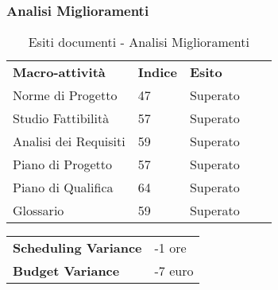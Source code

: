 \subsubsection{Analisi Miglioramenti}
\begin{table}[!ht]
			\centering
				\begin{tabular}{|l|l|l|ll}
					\cline{1-3}
					 \textbf{Macro-attività}  & \textbf{Indice \glossaryItem{Gulpease}}  & \textbf{Esito}  &  \\ \cline{1-3}
					 Norme di Progetto  & 47 & Superato &  \\ \cline{1-3}
					 Studio Fattibilità & 57 & Superato &  \\ \cline{1-3}
					 Analisi dei Requisiti & 59 & Superato &  \\ \cline{1-3}
					 Piano di Progetto & 57 & Superato &  \\ \cline{1-3}
					 Piano di Qualifica & 64 & Superato &  \\ \cline{1-3}
					 Glossario & 59 & Superato &  \\ \cline{1-3}
				\end{tabular}
				\caption{Esiti  documenti - Analisi Miglioramenti}
		\end{table}
		\begin{table}[!ht]
		\centering
		\begin{tabular}{l|l}
		\textbf{Scheduling Variance} & -1 ore \\
		\textbf{Budget Variance} & -7 euro \\
		\end{tabular}
		\end{table}
